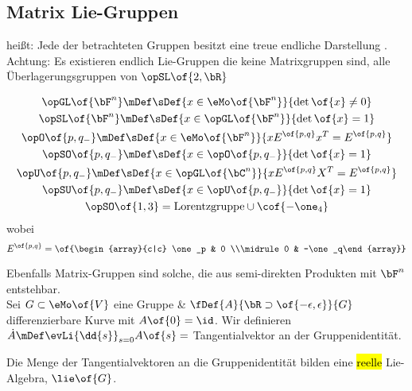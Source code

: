 \subsection{Matrix Lie-Gruppen}
 heißt: Jede der betrachteten Gruppen besitzt eine treue endliche Darstellung . Achtung: Es existieren endlich \dims Lie-Gruppen die keine Matrixgruppen sind, \exmpl alle Überlagerungsgruppen von $\opSL\of{2,\bR}$
\begin{beispiel}
	\begin{gather}
		\opGL\of{\bF^n} \mDef \sDef{x \in \eMo\of{\bF^n}}{\det\of{x} \neq 0} \\
		\opSL\of{\bF^n} \mDef \sDef{x \in \opGL\of{\bF^n}}{\det\of{x} = 1} \\
		\opO\of{p,q_{-}} \mDef \sDef{x \in \eMo\of{\bF^n}}{x E^{\of{p,q}} x^T = E^{\of{p,q}}} \\
		\opSO\of{p,q_{-}} \mDef \sDef{x \in \opO\of{p,q_{-}}}{\det\of{x} = 1} \\
		\opU\of{p,q_{-}} \mDef \sDef{x \in \opGL\of{\bC^n}}{x E^{\of{p,q}} X^{T} = E^{\of{p,q}}} \\
		\opSU\of{p,q_{-}} \mDef \sDef{x \in \opU\of{p,q_{-}}}{\det\of{x} = 1} \\
		\opSO\of{1,3} = \text{Lorentzgruppe} \cup \cof{-\one_4}
	\end{gather}
	wobei
	\begin{equation}
		E^{\of{p,q}} = \of{\begin{array}{c|c} \one_p & 0 \\\midrule 0 & -\one_q\end{array}}
	\end{equation}
\end{beispiel}
Ebenfalls Matrix-Gruppen sind solche, die aus semi-direkten Produkten mit $\bF^n$ entstehbar. \\
Sei $G \subset\eMo\of{V}$  eine Gruppe \& $\fDef{A}{\bR\supset \of{-\epsilon,\epsilon}}{G}$ differenzierbare Kurve mit $A\of{0} = \id$. Wir definieren $\dot{A} \mDef \evLi{\dd{s}}_{s=0} A\of{s} =$ Tangentialvektor an der Gruppenidentität.
\begin{satz}
	Die Menge der Tangentialvektoren an die Gruppenidentität bilden eine \hl{reelle} Lie-Algebra, $\lie\of{G}$.
\end{satz}
